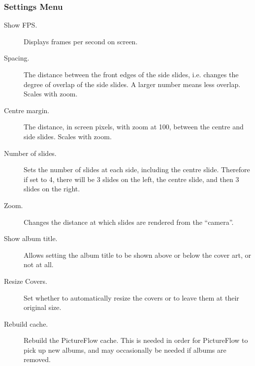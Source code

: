\subsubsection{Settings Menu}

\begin{description}
  \item[Show FPS.] Displays frames per second on screen.
  \item[Spacing.] The distance between the front edges of the side slides, i.e. changes
  the degree of overlap of the side slides. A larger number means less overlap. Scales with zoom.
  \item[Centre margin.] The distance, in screen pixels, with zoom at 100, between
  the centre and side slides. Scales with zoom.
  \item[Number of slides.] Sets the number of slides at each side, including the
  centre slide. Therefore if set to 4, there will be 3 slides on the left,
  the centre slide, and then 3 slides on the right.
  \item[Zoom.] Changes the distance at which slides are rendered from the ``camera''.
  \item[Show album title.] Allows setting the album title to be shown above or
  below the cover art, or not at all.
  \item[Resize Covers.] Set whether to automatically resize the covers or to leave
  them at their original size.
  \item[Rebuild cache.] Rebuild the PictureFlow cache. This is needed in order
  for PictureFlow to pick up new albums, and may occasionally be needed if albums
  are removed.
\end{description}
